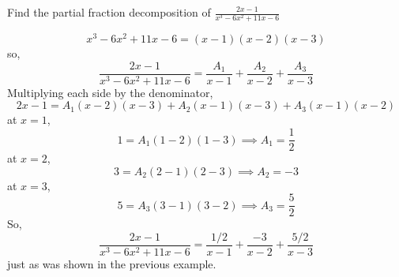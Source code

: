 \begin{example}
	Find the partial fraction decomposition of $\frac{2x-1}{x^3-6x^2+11x-6}$
\end{example}
\begin{equation*}
	x^3-6x^2+11x-6 = (x-1)(x-2)(x-3)
\end{equation*}
so,
\begin{equation*}
	\frac{2x-1}{x^3-6x^2+11x-6} = \frac{A_1}{x-1}+\frac{A_2}{x-2}+\frac{A_3}{x-3}
\end{equation*}
Multiplying each side by the denominator,
\begin{equation*}
	2x-1 = A_1(x-2)(x-3)+A_2(x-1)(x-3)+A_3(x-1)(x-2)
\end{equation*}
at $x=1$,
\begin{equation*}
	1 = A_1(1-2)(1-3) \implies A_1 = \frac{1}{2}
\end{equation*}
at $x=2$,
\begin{equation*}
	3 = A_2(2-1)(2-3) \implies A_2 = -3
\end{equation*}
at $x=3$,
\begin{equation*}
	5 = A_3(3-1)(3-2) \implies A_3 = \frac{5}{2}
\end{equation*}
So,
\begin{equation*}
	\frac{2x-1}{x^3-6x^2+11x-6} = \frac{1/2}{x-1} + \frac{-3}{x-2} + \frac{5/2}{x-3}
\end{equation*}
just as was shown in the previous example.